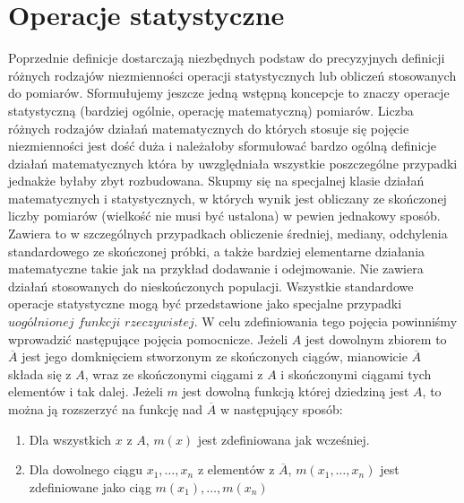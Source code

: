 \documentclass[12pt,a4paper]{report}
\begin{document}
\section{Operacje statystyczne}
Poprzednie definicje dostarczają niezbędnych podstaw do precyzyjnych definicji różnych rodzajów niezmienności operacji statystycznych lub obliczeń stosowanych do pomiarów. Sformułujemy jeszcze jedną wstępną koncepcje to znaczy operacje statystyczną  (bardziej ogólnie, operację matematyczną) pomiarów. Liczba różnych rodzajów działań matematycznych  do których stosuje się pojęcie niezmienności jest dość duża i należałoby sformułować bardzo ogólną definicje działań matematycznych która by uwzględniała wszystkie poszczególne przypadki jednakże byłaby zbyt rozbudowana. Skupmy się na specjalnej klasie działań matematycznych i statystycznych, w których wynik jest obliczany ze skończonej liczby pomiarów (wielkość nie musi być ustalona) w pewien jednakowy sposób. Zawiera to w szczególnych przypadkach obliczenie średniej, mediany, odchylenia standardowego ze skończonej próbki, a także bardziej elementarne działania matematyczne takie jak na przykład dodawanie i odejmowanie. Nie zawiera działań stosowanych do nieskończonych populacji. Wszystkie standardowe operacje statystyczne mogą być przedstawione jako specjalne przypadki $uogólnionej$ $funkcji$ $rzeczywistej$. W celu zdefiniowania tego pojęcia powinniśmy wprowadzić następujące pojęcia pomocnicze. Jeżeli $A$ jest dowolnym zbiorem to $\overline{A}$ jest jego domknięciem stworzonym ze skończonych ciągów, mianowicie $\overline{A}$ składa się z $A$, wraz ze skończonymi ciągami z $A$ i skończonymi ciągami tych elementów i tak dalej. Jeżeli $m$ jest dowolną funkcją której dziedziną jest $A$, to można ją rozszerzyć na funkcję nad $\overline{A}$ w następujący sposób:
\begin{enumerate}
\item
Dla wszystkich $x$ z $A$, $m(x)$ jest zdefiniowana jak wcześniej.
\item
Dla dowolnego ciągu $x_{1},\dots,x_{n}$ z elementów z $\overline{A}$, $m( x_{1},\dots,x_{n})$ jest zdefiniowane jako ciąg $m(x_{1}),\dots,m(x_{n})$
\end{enumerate} 
\end{document}
